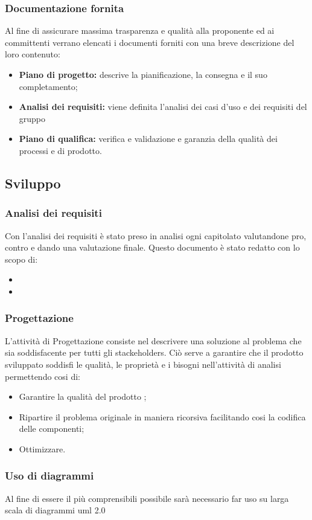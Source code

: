 \documentclass{article}
\begin{document}
    \subsubsection{Documentazione fornita}
    Al fine di assicurare massima trasparenza e qualità alla proponente ed ai committenti verrano elencati i documenti forniti con una breve descrizione del loro contenuto:
    \begin{itemize}
        \item \textbf{Piano di progetto:} descrive la pianificazione, la consegna e il suo completamento;
        \item \textbf{Analisi dei requisiti:} viene definita l'analisi dei casi d'uso e dei requisiti del gruppo
        \item \textbf{Piano di qualifica:} verifica e validazione e garanzia della qualità dei processi e di prodotto.
    \end{itemize}
    \subsection{Sviluppo}
    \subsubsection{Analisi dei requisiti}
    Con l'analisi dei requisiti è stato preso in analisi ogni capitolato valutandone pro, contro e dando una valutazione finale. Questo documento è stato redatto con lo scopo di:
    \begin{itemize}
        \item 
        \item 
    \end{itemize}
    \subsubsection{Progettazione}
    L'attività di Progettazione consiste nel descrivere una soluzione al problema che sia soddisfacente per tutti gli stackeholders. Ciò serve a garantire che il prodotto sviluppato soddisfi le qualità, le proprietà e i bisogni nell'attività di analisi permettendo cosi di:
    \begin{itemize}
        \item Garantire la qualità del prodotto ;
        \item Ripartire il problema originale in maniera ricorsiva facilitando cosi la codifica delle componenti;
        \item Ottimizzare.
    \end{itemize}	
    \subsubsection{Uso di diagrammi}
    Al fine di essere il più comprensibili possibile sarà necessario far uso su larga scala di diagrammi uml 2.0
        
        
\end{document}
